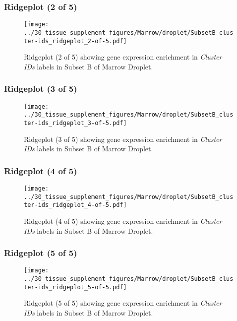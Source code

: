 \subsubsection{Ridgeplot (2 of 5)}
\begin{figure}[h]
\centering
\texttt{[image: ../30\_tissue\_supplement\_figures/Marrow/droplet/SubsetB\_cluster-ids\_ridgeplot\_2-of-5.pdf]}

\caption{ Ridgeplot (2 of 5)  showing gene expression enrichment in \emph{Cluster IDs} labels in Subset B of Marrow Droplet. }
\end{figure}


\clearpage

\subsubsection{Ridgeplot (3 of 5)}
\begin{figure}[h]
\centering
\texttt{[image: ../30\_tissue\_supplement\_figures/Marrow/droplet/SubsetB\_cluster-ids\_ridgeplot\_3-of-5.pdf]}

\caption{ Ridgeplot (3 of 5)  showing gene expression enrichment in \emph{Cluster IDs} labels in Subset B of Marrow Droplet. }
\end{figure}


\clearpage

\subsubsection{Ridgeplot (4 of 5)}
\begin{figure}[h]
\centering
\texttt{[image: ../30\_tissue\_supplement\_figures/Marrow/droplet/SubsetB\_cluster-ids\_ridgeplot\_4-of-5.pdf]}

\caption{ Ridgeplot (4 of 5)  showing gene expression enrichment in \emph{Cluster IDs} labels in Subset B of Marrow Droplet. }
\end{figure}


\clearpage

\subsubsection{Ridgeplot (5 of 5)}
\begin{figure}[h]
\centering
\texttt{[image: ../30\_tissue\_supplement\_figures/Marrow/droplet/SubsetB\_cluster-ids\_ridgeplot\_5-of-5.pdf]}

\caption{ Ridgeplot (5 of 5)  showing gene expression enrichment in \emph{Cluster IDs} labels in Subset B of Marrow Droplet. }
\end{figure}


